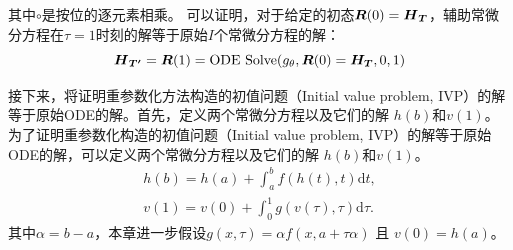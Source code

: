 其中$\circ$是按位的逐元素相乘。
可以证明，对于给定的初态$\boldsymbol R(0) = \boldsymbol{{H}}_{\boldsymbol{T}}$，辅助常微分方程在$\tau=1$时刻的解等于原始$I$个常微分方程的解：
\begin{equation}
    \boldsymbol{{H}}_{\boldsymbol{T'}}=\boldsymbol{R}(1)= \text{ODE Solve}(g_\theta, \boldsymbol{R}(0)=\boldsymbol{H}_{\boldsymbol{T}}, 0, 1)
    \label{equ:parallel_solver}
\end{equation}

接下来，将证明重参数化方法构造的初值问题（Initial value problem, IVP）的解等于原始ODE的解。首先，定义两个常微分方程以及它们的解 $h(b)$和$v(1)$。
为了证明重参数化构造的初值问题（Initial value problem, IVP）的解等于原始ODE的解，可以定义两个常微分方程以及它们的解 $h(b)$和$v(1)$。
\begin{equation}
    \begin{aligned}
        h(b) = h(a) + \int_{a}^{b} f(h(t), t)\text{d}t,\\
        v(1) = v(0) + \int_{0}^{1} g(v(\tau), \tau) \text{d}\tau.
    \end{aligned}
\end{equation}
其中$\alpha = b-a$，本章进一步假设$g(x, \tau)= {\alpha}f(x, a+\tau\alpha)$ 且 $v(0)=h(a)$。


